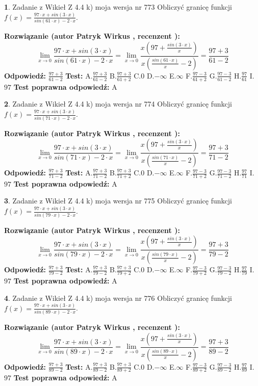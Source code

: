 \documentclass[12pt, a4paper]{article}
\theoremstyle{definition} %
\newtheorem{zad}{}
\newcommand{\zadStart}[1]{\begin{zad}#1\newline}
\newcommand{\zadStop}{\end{zad}}
\newcommand{\rozwStart}[2]{\noindent \textbf{Rozwiązanie (autor #1 , recenzent #2): }\newline}
\newcommand{\rozwStop}{\newline}
\newcommand{\odpStart}{\noindent \textbf{Odpowiedź:}\newline}
\newcommand{\odpStop}{\newline}
\newcommand{\testStart}{\noindent \textbf{Test:}\newline}
\newcommand{\testStop}{\newline}
\newcommand{\kluczStart}{\noindent \textbf{Test poprawna odpowiedź:}\newline}
\newcommand{\kluczStop}{\newline}
\begin{document}
\zadStart{Zadanie z Wikieł Z 4.4 k) moja wersja nr 773}
Obliczyć granicę funkcji $f(x)=\frac{97\cdot x +sin(3\cdot x)}{sin(61\cdot x) -2\cdot x}$.
\zadStop
\rozwStart{Patryk Wirkus}{}
$$\lim\limits_{x\to 0}\frac{97\cdot x +sin(3\cdot x)}{sin(61\cdot x) -2\cdot x}
=\lim\limits_{x\to 0}\frac{x(97+\frac{sin(3\cdot x)}{x})}{x(\frac{sin(61\cdot x)}{x}-2)}
=\frac{97+3}{61-2}$$
\rozwStop
\odpStart
$\frac{97+3}{61-2}$
\odpStop
\testStart
A.$\frac{97+3}{61-2}$
B.$\frac{97+3}{61+2}$
C.$0$
D.$-\infty$
E.$\infty$
F.$\frac{97-3}{61+2}$
G.$\frac{97-3}{61-2}$
H.$\frac{97}{61}$
I.$97$
\testStop
\kluczStart
A
\kluczStop



\zadStart{Zadanie z Wikieł Z 4.4 k) moja wersja nr 774}
Obliczyć granicę funkcji $f(x)=\frac{97\cdot x +sin(3\cdot x)}{sin(71\cdot x) -2\cdot x}$.
\zadStop
\rozwStart{Patryk Wirkus}{}
$$\lim\limits_{x\to 0}\frac{97\cdot x +sin(3\cdot x)}{sin(71\cdot x) -2\cdot x}
=\lim\limits_{x\to 0}\frac{x(97+\frac{sin(3\cdot x)}{x})}{x(\frac{sin(71\cdot x)}{x}-2)}
=\frac{97+3}{71-2}$$
\rozwStop
\odpStart
$\frac{97+3}{71-2}$
\odpStop
\testStart
A.$\frac{97+3}{71-2}$
B.$\frac{97+3}{71+2}$
C.$0$
D.$-\infty$
E.$\infty$
F.$\frac{97-3}{71+2}$
G.$\frac{97-3}{71-2}$
H.$\frac{97}{71}$
I.$97$
\testStop
\kluczStart
A
\kluczStop



\zadStart{Zadanie z Wikieł Z 4.4 k) moja wersja nr 775}
Obliczyć granicę funkcji $f(x)=\frac{97\cdot x +sin(3\cdot x)}{sin(79\cdot x) -2\cdot x}$.
\zadStop
\rozwStart{Patryk Wirkus}{}
$$\lim\limits_{x\to 0}\frac{97\cdot x +sin(3\cdot x)}{sin(79\cdot x) -2\cdot x}
=\lim\limits_{x\to 0}\frac{x(97+\frac{sin(3\cdot x)}{x})}{x(\frac{sin(79\cdot x)}{x}-2)}
=\frac{97+3}{79-2}$$
\rozwStop
\odpStart
$\frac{97+3}{79-2}$
\odpStop
\testStart
A.$\frac{97+3}{79-2}$
B.$\frac{97+3}{79+2}$
C.$0$
D.$-\infty$
E.$\infty$
F.$\frac{97-3}{79+2}$
G.$\frac{97-3}{79-2}$
H.$\frac{97}{79}$
I.$97$
\testStop
\kluczStart
A
\kluczStop



\zadStart{Zadanie z Wikieł Z 4.4 k) moja wersja nr 776}
Obliczyć granicę funkcji $f(x)=\frac{97\cdot x +sin(3\cdot x)}{sin(89\cdot x) -2\cdot x}$.
\zadStop
\rozwStart{Patryk Wirkus}{}
$$\lim\limits_{x\to 0}\frac{97\cdot x +sin(3\cdot x)}{sin(89\cdot x) -2\cdot x}
=\lim\limits_{x\to 0}\frac{x(97+\frac{sin(3\cdot x)}{x})}{x(\frac{sin(89\cdot x)}{x}-2)}
=\frac{97+3}{89-2}$$
\rozwStop
\odpStart
$\frac{97+3}{89-2}$
\odpStop
\testStart
A.$\frac{97+3}{89-2}$
B.$\frac{97+3}{89+2}$
C.$0$
D.$-\infty$
E.$\infty$
F.$\frac{97-3}{89+2}$
G.$\frac{97-3}{89-2}$
H.$\frac{97}{89}$
I.$97$
\testStop
\kluczStart
A
\kluczStop
\end{document}

